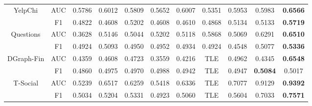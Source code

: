 \begin{table}[t]
{\begin{tabular}{cc|ccccccccc}
\multirow{2}{*}{YelpChi}    & AUC     & 0.5786 & 0.6012 & 0.5809 & 0.5652    & 0.6007 & 0.5351 & 0.5953          & 0.5983          & \textbf{0.6566} \\
                            & F1      & 0.4822 & 0.4608 & 0.5202 & 0.4608    & 0.4610 & 0.4868 & 0.5134          & 0.5133          & \textbf{0.5719} \\ \hline
\multirow{2}{*}{Questions}  & AUC     & 0.3628 & 0.5146 & 0.5044 & 0.5202    & 0.5118 & 0.5868 & 0.5069          & 0.6291          & \textbf{0.6510} \\
                            & F1      & 0.4924 & 0.5093 & 0.4950 & 0.4952    & 0.4934 & 0.4924 & 0.4548          & 0.5077          & \textbf{0.5336} \\ \hline
\multirow{2}{*}{DGraph-Fin} & AUC     & 0.4359 & 0.4608 & 0.4723 & 0.3559    & 0.4216 & TLE    & 0.4962          & 0.4345          & \textbf{0.6548} \\
                            & F1      & 0.4860 & 0.4975 & 0.4970 & 0.4988    & 0.4942 & TLE    & 0.4947          & \textbf{0.5084} & 0.5017          \\ \hline
\multirow{2}{*}{T-Social}   & AUC     & 0.5239 & 0.6517 & 0.6259 & 0.5418    & 0.6336 & TLE    & 0.7077          & 0.9129          & \textbf{0.9392} \\
                            & F1      & 0.5034 & 0.5204 & 0.5331 & 0.4923    & 0.5060 & TLE    & 0.5604          & 0.7033          & \textbf{0.7571} \\ \hline \hline
\end{tabular}
}\vspace{-4mm}
\end{table}